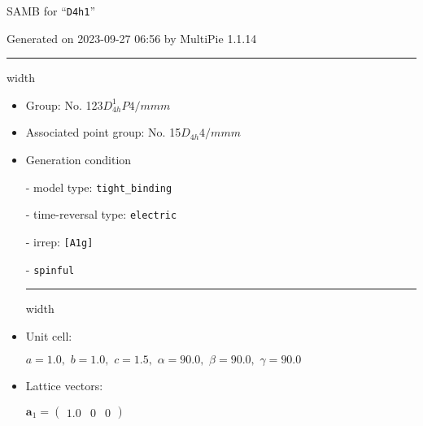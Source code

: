 \documentclass[fleqn,10pt,landscape]{article}
\begin{document}
\setcounter{MaxMatrixCols}{16}

\setlength{\baselineskip}{16pt}
\footnotesize
\begin{center}
\LARGE
SAMB for ``\texttt{D4h1}''
\end{center}
\begin{flushright}
Generated on 2023-09-27 06:56 by MultiPie 1.1.14
\end{flushright}
\vspace{1cm}


 \hfil \hrule height 1mm width \textwidth \hfil

\begin{itemize}
\item Group: No. 123\quad$D_{4h}^{1}$\quad$P4/mmm$\quad[ tetragonal ]

\item Associated point group: No. 15\quad$D_{4h}$\quad$4/mmm$\quad[ tetragonal ]

\vspace{5mm}

\item Generation condition

\quad - model type: \texttt{tight_binding}

\quad - time-reversal type: \texttt{electric}

\quad - irrep: \texttt{[A1g]}

\quad - \texttt{spinful}


 \hfil \hrule height 1mm width \textwidth \hfil

\item Unit cell:

\quad $a=1.0,\,\, b=1.0,\,\, c=1.5,\,\, \alpha=90.0,\,\, \beta=90.0,\,\, \gamma=90.0$

\item Lattice vectors:

\quad $\bm{a}_1=\begin{pmatrix} 1.0 & 0 & 0 \end{pmatrix}$


\end{itemize}
\end{document}

